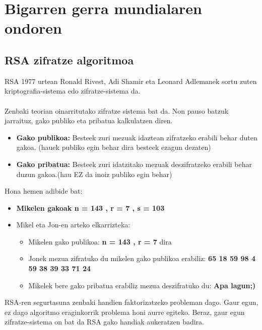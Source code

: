 \documentclass[12pt]{basque-book}
\begin{document}
\section{Bigarren gerra mundialaren ondoren}
\subsection{RSA zifratze algoritmoa}
RSA 1977 urtean Ronald Rivest, Adi Shamir eta Leonard Adlemanek sortu zuten kriptografia-sistema edo zifratze-sistema da.
\\\\
Zenbaki teorian oinarritutako zifratze sistema bat da. Non pauso batzuk jarraituz, gako publiko eta pribatua kalkulatzen diren.
\begin{itemize}
    \item \textbf{Gako publikoa:} Besteek zuri mezuak idaztean zifratzeko erabili behar duten gakoa.
    (hauek publiko egin behar dira besteek ezagun dezaten)
    \item \textbf{Gako pribatua:} Besteek zuri idatzitako mezuak deszifratzeko erabili behar duzun gakoa.(hau EZ da inoiz publiko egin behar)
\end{itemize}
Hona hemen adibide bat:
\begin{itemize}
    \item \textbf{Mikelen gakoak n =  143 , r =  7 , s = 103}
    \item Mikel eta Jon-en arteko elkarrizteka:
    \begin{itemize}
    \item Mikelen gako publikoa:
    \textbf{n =  143 , r =  7} dira
    \item Jonek mezua zifratuko du mikelen gako publikoa erabiliz:\newline
    \textbf{65 18 59 98  4 59 38 39 33 71 24}
    \item Mikelek bere gako pribatua erabiliz mezua deszifratuko du:\newline
    \textbf{Apa lagun;)}
    \end{itemize}
\end{itemize}
RSA-ren segurtasuna zenbaki handien faktorizatzeko probleman dago. Gaur egun, ez dago algoritmo eraginkorrik problema honi aurre egiteko. Beraz, gaur egun zifratze-sistema on bat da RSA gako handiak aukeratzen badira.
\end{document}

